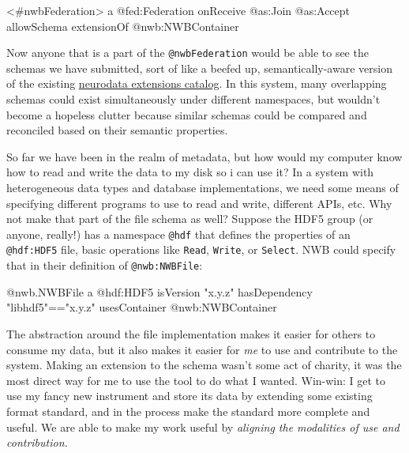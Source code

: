 \documentclass[10pt]{article}
\newenvironment{Shaded}{}{}
\newcommand{\NormalTok}[1]{#1}
\begin{document}
\begin{multicols}{2}
\begin{Shaded}
\begin{Highlighting}[]
\NormalTok{\textless{}\#nwbFederation\textgreater{}}
\NormalTok{  a @fed:Federation}
\NormalTok{  onReceive}
\NormalTok{    @as:Join @as:Accept}
\NormalTok{  allowSchema}
\NormalTok{    extensionOf @nwb:NWBContainer}
\end{Highlighting}
\end{Shaded}

Now anyone that is a part of the \texttt{@nwbFederation} would be able
to see the schemas we have submitted, sort of like a beefed up,
semantically-aware version of the existing
\href{https://nwb-extensions.github.io/}{neurodata extensions catalog}.
In this system, many overlapping schemas could exist simultaneously
under different namespaces, but wouldn't become a hopeless clutter
because similar schemas could be compared and reconciled based on their
semantic properties.

So far we have been in the realm of metadata, but how would my computer
know how to read and write the data to my disk so i can use it? In a
system with heterogeneous data types and database implementations, we
need some means of specifying different programs to use to read and
write, different APIs, etc. Why not make that part of the file schema as
well? Suppose the HDF5 group (or anyone, really!) has a namespace
\texttt{@hdf} that defines the properties of an \texttt{@hdf:HDF5} file,
basic operations like \texttt{Read}, \texttt{Write}, or \texttt{Select}.
NWB could specify that in their definition of \texttt{@nwb:NWBFile}:

\begin{Shaded}
\begin{Highlighting}[]
\NormalTok{@nwb.NWBFile}
\NormalTok{  a @hdf:HDF5}
\NormalTok{    isVersion "x.y.z"}
\NormalTok{    hasDependency "libhdf5"=="x.y.z"}
\NormalTok{  usesContainer @nwb:NWBContainer}
\end{Highlighting}
\end{Shaded}

The abstraction around the file implementation makes it easier for
others to consume my data, but it also makes it easier for \emph{me} to
use and contribute to the system. Making an extension to the schema
wasn't some act of charity, it was the most direct way for me to use the
tool to do what I wanted. Win-win: I get to use my fancy new instrument
and store its data by extending some existing format standard, and in
the process make the standard more complete and useful. We are able to
make my work useful by \emph{aligning the modalities of use and
contribution.}


\end{multicols}
\end{document}
